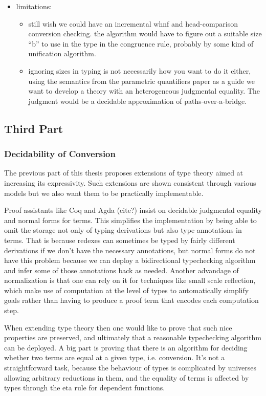 \documentclass{book}
\begin{document}
\begin{itemize}
 \item limitations:
     \begin{itemize}
     \item still wish we could have an incremental whnf and
     head-comparison conversion checking. the algorithm would have to
     figure out a suitable size ``b'' to use in the type in the
     congruence rule, probably by some kind of unification algorithm.

     \item ignoring sizes in typing is not necessarily how you want to do
     it either, using the semantics from the parametric quantifiers
     paper as a guide we want to develop a theory with an
     heterogeneous judgmental equality.
     The judgment would be a decidable approximation of
     paths-over-a-bridge.
     \end{itemize}
    \end{itemize}

\subsection{Third Part}

\subsubsection{Decidability of Conversion}

The previous part of this thesis proposes extensions of type theory
aimed at increasing its expressivity. Such extensions are shown
consistent through various models but we also want them to be
practically implementable.

Proof assistants like Coq and Agda (cite?) insist on decidable
judgmental equality and normal forms for terms. This simplifies the
implementation by being able to omit the storage not only of typing
derivations but also type annotations in terms. That is because
redexes can sometimes be typed by fairly different derivations if we
don't have the necessary annotations, but normal forms do not have
this problem because we can deploy a bidirectional typechecking
algorithm and infer some of those annotations back as needed. Another
advandage of normalization is that one can rely on it for techniques
like small scale reflection, which make use of computation at the
level of types to automatically simplify goals rather than having to
produce a proof term that encodes each computation step.

When extending type theory then one would like to prove that such nice
properties are preserved, and ultimately that a reasonable
typechecking algorithm can be deployed. A big part is proving that
there is an algorithm for deciding whether two terms are equal at a
given type, i.e. conversion. It's not a straightforward task, because
the behaviour of types is complicated by universes allowing arbitrary
reductions in them, and the equality of terms is affected by types
through the eta rule for dependent functions.
\end{document}
